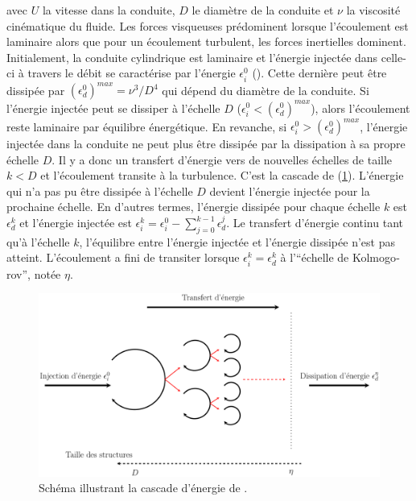 avec $U$ la vitesse dans la conduite, $D$ le diamètre de la conduite et $\nu$ la viscosité cinématique du fluide. Les forces visqueuses prédominent lorsque l'écoulement est laminaire alors que pour un écoulement turbulent, les forces inertielles dominent. Initialement, la conduite cylindrique est laminaire et l'énergie injectée dans celle-ci à travers le débit se caractérise par l'énergie $\epsilon_{i}^{0}$ (\cite{Bourgoin_Lecture}). Cette dernière peut être dissipée par $\left( \epsilon_{d}^{0} \right)^{max}=\nu^{3}/D^{4}$ qui dépend du diamètre de la conduite. Si l'énergie injectée peut se dissiper à l'échelle $D$ ($\epsilon_{i}^{0}<\left( \epsilon_{d}^{0} \right)^{max}$), alors l'écoulement reste laminaire par équilibre énergétique. En revanche, si $\epsilon_{i}^{0}>\left( \epsilon_{d}^{0} \right)^{max}$, l'énergie injectée dans la conduite ne peut plus être dissipée par la dissipation à sa propre échelle $D$. Il y a donc un transfert d'énergie vers de nouvelles échelles de taille $k<D$ et l'écoulement transite à la turbulence. C'est la cascade de \citet{richardson1922} (\cref{fig/richardson_cascade}). L'énergie qui n'a pas pu être dissipée à l'échelle $D$ devient l'énergie injectée pour la prochaine échelle. En d'autres termes, l'énergie dissipée pour chaque échelle $k$ est $\epsilon_{d}^{k}$ et l'énergie injectée est $\epsilon_{i}^{k}=\epsilon_{i}^{0}-\sum_{j=0}^{k-1} \epsilon_{d}^{j}$. Le transfert d'énergie continu tant qu'à l'échelle $k$, l'équilibre entre l'énergie injectée et l'énergie dissipée n'est pas atteint. L'écoulement a fini de transiter lorsque $\epsilon_{i}^{k}=\epsilon_{d}^{k}$ à l'\foreignquote{french}{échelle de Kolmogorov}, notée $\eta$.

\begin{figure}[!hbtp]
    \centering
    \includegraphics[width=\linewidth]{Chap1/Pictures/richardson_cascade.pdf}
    \caption{Schéma illustrant la cascade d'énergie de \citet{richardson1922}.}
    \label{fig/richardson_cascade}
\end{figure}

